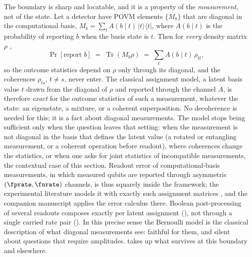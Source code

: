 The boundary is sharp and locatable, and it is a property of the
\emph{measurement}, not of the state. Let a detector have POVM elements
$\{M_b\}$ that are diagonal in the computational basis, $M_b = \sum_t
A(b \mid t)\, \lvert t \rangle\langle t \rvert$, where $A(b \mid t)$ is the probability of
reporting $b$ when the basis state is $t$. Then for \emph{every} density
matrix $\rho$
\parencite{nielsen-chuang-2010},
\[
  \Pr[\text{report } b]
  \;=\; \operatorname{Tr}(M_b \rho)
  \;=\; \sum_t A(b \mid t)\, \rho_{tt},
\]
so the outcome statistics depend on $\rho$ only through its diagonal, and
the coherences $\rho_{ts}$, $t \ne s$, never enter. The classical
assignment model, a latent basis value $t$ drawn from the diagonal of
$\rho$ and reported through the channel $A$, is therefore \emph{exact} for
the outcome statistics of such a measurement, whatever the state:
an eigenstate, a mixture, or a coherent superposition. No decoherence
is needed for this; it is a fact about diagonal measurements. The model
stops being sufficient only when the question leaves that setting: when
the measurement is not diagonal in the basis that defines the latent
value (a rotated or entangling measurement, or a coherent operation
before readout), where coherences change the statistics, or when one asks
for joint statistics of incompatible measurements, the contextual case of
this section. Readout error of computational-basis measurements, in which
measured qubits are reported through asymmetric $(\fprate, \fnrate)$
channels, is thus squarely inside the framework;
the experimental literature models it with exactly such assignment
matrices \parencite{bravyi-et-al-2021,nation-et-al-2021,smith-et-al-2021},
and the companion manuscript \parencite{towell-bernoulli-quantum-readout}
applies the error calculus there. Boolean post-processing of several
readouts composes exactly per latent assignment
(), not through a single carried rate pair
(). In this precise sense the Bernoulli
model is the classical description of what diagonal measurements see:
faithful for them, and silent about questions that require amplitudes.
 takes up what survives at this boundary
and elsewhere.
